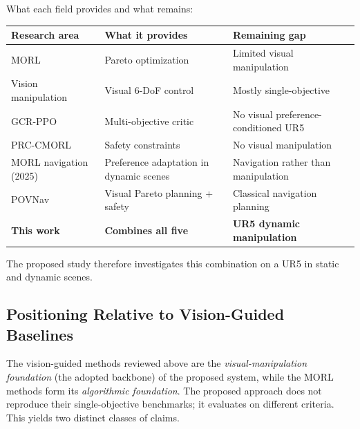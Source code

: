 \documentclass[11pt,a4paper]{article}
\begin{document}
\vspace{0.6em}
What each field provides and what remains:

\renewcommand{\arraystretch}{1.25}
\begin{tabularx}{\linewidth}{@{}l X X@{}}
\toprule
\textbf{Research area} & \textbf{What it provides} &
\textbf{Remaining gap} \\
\midrule
MORL & Pareto optimization & Limited visual manipulation \\
Vision manipulation & Visual 6-DoF control & Mostly single-objective \\
GCR-PPO & Multi-objective critic & No visual preference-conditioned
UR5 \\
PRC-CMORL & Safety constraints & No visual manipulation \\
MORL navigation (2025) & Preference adaptation in dynamic scenes &
Navigation rather than manipulation \\
POVNav & Visual Pareto planning + safety & Classical navigation
planning \\
\textbf{This work} & \textbf{Combines all five} &
\textbf{UR5 dynamic manipulation} \\
\bottomrule
\end{tabularx}

\vspace{0.6em}
The proposed study therefore investigates this combination on a UR5 in
static and dynamic scenes.

\subsection{Positioning Relative to Vision-Guided Baselines}

The vision-guided methods reviewed above are the \emph{visual-manipulation
foundation} (the adopted backbone) of the proposed system, while the MORL
methods form its \emph{algorithmic foundation}. The proposed approach does
not reproduce their single-objective benchmarks; it evaluates on different
criteria. This yields two distinct classes of claims.
\end{document}
